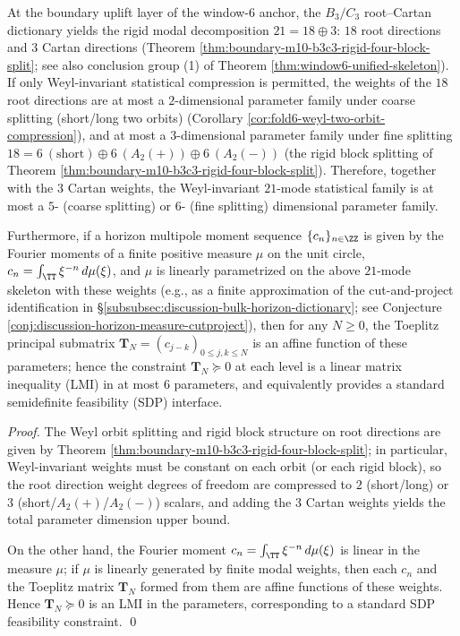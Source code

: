 \begin{proposition}\label{prop:xi-horizon-21mode-weyl-compression}
At the boundary uplift layer of the window-\(6\) anchor, the \(B_3/C_3\) root--Cartan dictionary yields the rigid modal decomposition
\(
21=18\oplus 3
\):
\(18\) root directions and \(3\) Cartan directions (Theorem \ref{thm:boundary-m10-b3c3-rigid-four-block-split}; see also conclusion group (1) of Theorem \ref{thm:window6-unified-skeleton}).
If only Weyl-invariant statistical compression is permitted, the weights of the \(18\) root directions are at most a \(2\)-dimensional parameter family under coarse splitting (short/long two orbits) (Corollary \ref{cor:fold6-weyl-two-orbit-compression}), and at most a \(3\)-dimensional parameter family under fine splitting
\(
18=6\ (\mathrm{short})\oplus 6\ (A_2(+))\oplus 6\ (A_2(-))
\)
(the rigid block splitting of Theorem \ref{thm:boundary-m10-b3c3-rigid-four-block-split}).
Therefore, together with the \(3\) Cartan weights, the Weyl-invariant \(21\)-mode statistical family is at most a \(5\)- (coarse splitting) or \(6\)- (fine splitting) dimensional parameter family.
\par
Furthermore, if a horizon multipole moment sequence \(\{c_n\}_{n\in\ZZ}\) is given by the Fourier moments of a finite positive measure \(\mu\) on the unit circle,
\(
c_n=\int_{\TT}\xi^{-n}\,d\mu(\xi)
\),
and \(\mu\) is linearly parametrized on the above \(21\)-mode skeleton with these weights (e.g., as a finite approximation of the cut-and-project identification in \S\ref{subsubsec:discussion-bulk-horizon-dictionary}; see Conjecture \ref{conj:discussion-horizon-measure-cutproject}),
then for any \(N\ge 0\), the Toeplitz principal submatrix
\(
\mathbf{T}_N=(c_{j-k})_{0\le j,k\le N}
\)
is an affine function of these parameters; hence the constraint \(\mathbf{T}_N\succeq 0\) at each level is a linear matrix inequality (LMI) in at most \(6\) parameters, and equivalently provides a standard semidefinite feasibility (SDP) interface.
\end{proposition}
\begin{proof}
The Weyl orbit splitting and rigid block structure on root directions are given by Theorem \ref{thm:boundary-m10-b3c3-rigid-four-block-split}; in particular, Weyl-invariant weights must be constant on each orbit (or each rigid block), so the root direction weight degrees of freedom are compressed to \(2\) (short/long) or \(3\) (short/\(A_2(+)\)/\(A_2(-)\)) scalars, and adding the \(3\) Cartan weights yields the total parameter dimension upper bound.
\par
On the other hand, the Fourier moment \(c_n=\int_{\TT}\xi^{-n}\,d\mu(\xi)\) is linear in the measure \(\mu\); if \(\mu\) is linearly generated by finite modal weights, then each \(c_n\) and the Toeplitz matrix \(\mathbf{T}_N\) formed from them are affine functions of these weights. Hence \(\mathbf{T}_N\succeq 0\) is an LMI in the parameters, corresponding to a standard SDP feasibility constraint. \qed
\end{proof}

